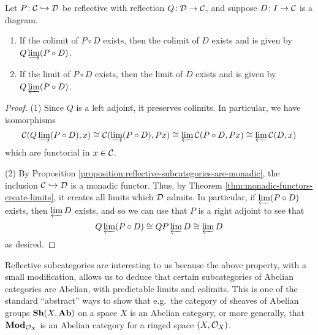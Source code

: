\begin{theorem}\label{thm:limits-and-colimits-in-reflective-subcategories}
	Let \(P\!:\calC\inj\calD\) be reflective with reflection \(Q\!:\calD\to\calC\), and suppose \(D\!:I\to\calC\) is a diagram.
	\begin{enumerate}[label=(\arabic*)]
	\item If the colimit of \(P\circ D\) exists, then the colimit of \(D\) exists and is given by \(Q\injlim(P\circ D)\).
	\item If the limit of \(P\circ D\) exists, then the limit of \(D\) exists and is given by \(Q\projlim(P\circ D)\).
	\end{enumerate}
\end{theorem}
\begin{proof}
(1) Since \(Q\) is a left adjoint, it preserves colimits. In particular, we have isomorphisms
\[  \calC(Q\injlim(P\circ D),x)\cong \calC(\injlim(P\circ D),Px) \cong \projlim\calC(P\circ D,Px) \cong \projlim\calC(D,x) \]
which are functorial in \(x\in\calC\).

(2) By Proposition \ref{proposition:reflective-subcategories-are-monadic}, the inclusion \(\calC\inj\calD\) is a monadic functor. Thus, by Theorem \ref{thm:monadic-functors-create-limits},
it creates all limits which \(\calD\) admits. In particular, if \(\projlim(P\circ D)\) exists, then \(\projlim{D}\) exists, and so we can use that \(P\) is a right adjoint to see that
\[ Q\projlim(P\circ D) \cong QP\projlim{D} \cong\projlim{D} \]
as desired.
\end{proof}

Reflective subcategories are interesting to us because the above property, with a small modification, allows us to deduce that certain subcategories of Abelian categories are
Abelian, with predictable limits and colimits. This is one of the standard ``abstract'' ways to show that e.g.\ the category of sheaves of Abelian groups \(\Sh(X,\Ab)\) on a space \(X\) is an Abelian category,
or more generally, that \(\Mod_{\Ox_X}\) is an Abelian category for a ringed space \((X,\Ox_X)\).


